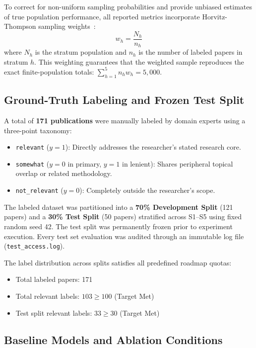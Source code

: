 To correct for non-uniform sampling probabilities and provide unbiased estimates of true population performance, all reported metrics incorporate Horvitz-Thompson sampling weights~\cite{horvitz1952generalization}:
\begin{equation}
w_h = \frac{N_h}{n_h}
\end{equation}
where $N_h$ is the stratum population and $n_h$ is the number of labeled papers in stratum $h$. This weighting guarantees that the weighted sample reproduces the exact finite-population totals: $\sum_{h=1}^5 n_h w_h = 5,000$.

\subsection{Ground-Truth Labeling and Frozen Test Split}
\label{sec:ground_truth}

A total of \textbf{171 publications} were manually labeled by domain experts using a three-point taxonomy:
\begin{itemize}
    \item \texttt{relevant} ($y=1$): Directly addresses the researcher's stated research core.
    \item \texttt{somewhat} ($y=0$ in primary, $y=1$ in lenient): Shares peripheral topical overlap or related methodology.
    \item \texttt{not\_relevant} ($y=0$): Completely outside the researcher's scope.
\end{itemize}

The labeled dataset was partitioned into a \textbf{70\% Development Split} (121 papers) and a \textbf{30\% Test Split} (50 papers) stratified across S1--S5 using fixed random seed 42. The test split was permanently frozen prior to experiment execution. Every test set evaluation was audited through an immutable log file (\texttt{test\_access.log}).

The label distribution across splits satisfies all predefined roadmap quotas:
\begin{itemize}
    \item Total labeled papers: 171
    \item Total relevant labels: $103 \ge 100$ (Target Met)
    \item Test split relevant labels: $33 \ge 30$ (Target Met)
\end{itemize}

\subsection{Baseline Models and Ablation Conditions}
\label{sec:baselines}

